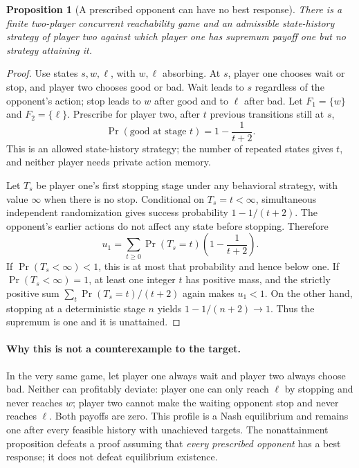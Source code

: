 \documentclass[11pt,a4paper]{article}
\newtheorem{proposition}[theorem]{Proposition}
\theoremstyle{definition}
\theoremstyle{remark}
\begin{document}
\begin{proposition}[A prescribed opponent can have no best response]
There is a finite two-player concurrent reachability game and an admissible state-history strategy of player two against which player one has supremum payoff one but no strategy attaining it.
\end{proposition}
\begin{proof}
Use states $s,w,\ell$, with $w,\ell$ absorbing. At $s$, player one chooses wait or stop, and player two chooses good or bad. Wait leads to $s$ regardless of the opponent's action; stop leads to $w$ after good and to $\ell$ after bad. Let $F_1=\{w\}$ and $F_2=\{\ell\}$. Prescribe for player two, after $t$ previous transitions still at $s$,
\[
 \Pr(\text{good at stage }t)=1-\frac1{t+2}.
\]
This is an allowed state-history strategy; the number of repeated states gives $t$, and neither player needs private action memory.

Let $T_s$ be player one's first stopping stage under any behavioral strategy, with value $\infty$ when there is no stop. Conditional on $T_s=t<\infty$, simultaneous independent randomization gives success probability $1-1/(t+2)$. The opponent's earlier actions do not affect any state before stopping. Therefore
\[
 u_1=\sum_{t\geq0}\Pr(T_s=t)\left(1-\frac1{t+2}\right).
\]
If $\Pr(T_s<\infty)<1$, this is at most that probability and hence below one. If $\Pr(T_s<\infty)=1$, at least one integer $t$ has positive mass, and the strictly positive sum $\sum_t\Pr(T_s=t)/(t+2)$ again makes $u_1<1$. On the other hand, stopping at a deterministic stage $n$ yields $1-1/(n+2)\to1$. Thus the supremum is one and it is unattained.
\end{proof}

\paragraph{Why this is not a counterexample to the target.}
In the very same game, let player one always wait and player two always choose bad. Neither can profitably deviate: player one can only reach $\ell$ by stopping and never reaches $w$; player two cannot make the waiting opponent stop and never reaches $\ell$. Both payoffs are zero. This profile is a Nash equilibrium and remains one after every feasible history with unachieved targets. The nonattainment proposition defeats a proof assuming that \emph{every prescribed opponent} has a best response; it does not defeat equilibrium existence.
\end{document}
